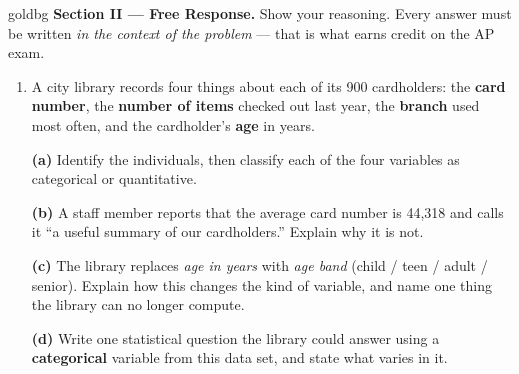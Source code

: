 \documentclass[12pt]{article}
\begin{document}
\boxguard[16]
\begin{headlinebox}{goldbg}
\small
\textbf{Section II --- Free Response.} Show your reasoning. Every answer must be written
\emph{in the context of the problem} --- that is what earns credit on the AP exam.
\end{headlinebox}

\vspace{0.10in}

\begin{enumerate}[leftmargin=1.9em, itemsep=0.16in, resume]

  \boxguard[21]
  \item A city library records four things about each of its 900 cardholders: the
        \textbf{card number}, the \textbf{number of items} checked out last year, the
        \textbf{branch} used most often, and the cardholder's \textbf{age} in years.

        \boxguard[17]
        \vspace{6pt}
        \textbf{(a)} Identify the individuals, then classify each of the four variables as
        categorical or quantitative.\\[4pt]

        \boxguard[17]
        \vspace{6pt}
        \textbf{(b)} A staff member reports that the average card number is 44{,}318 and calls
        it ``a useful summary of our cardholders.'' Explain why it is not.\\[4pt]

        \boxguard[17]
        \vspace{6pt}
        \textbf{(c)} The library replaces \emph{age in years} with \emph{age band}
        (child / teen / adult / senior). Explain how this changes the kind of variable, and
        name one thing the library can no longer compute.\\[4pt]

        \boxguard[17]
        \vspace{6pt}
        \textbf{(d)} Write one statistical question the library could answer using a
        \textbf{categorical} variable from this data set, and state what varies in it.\\[4pt]

\end{enumerate}
\end{document}

